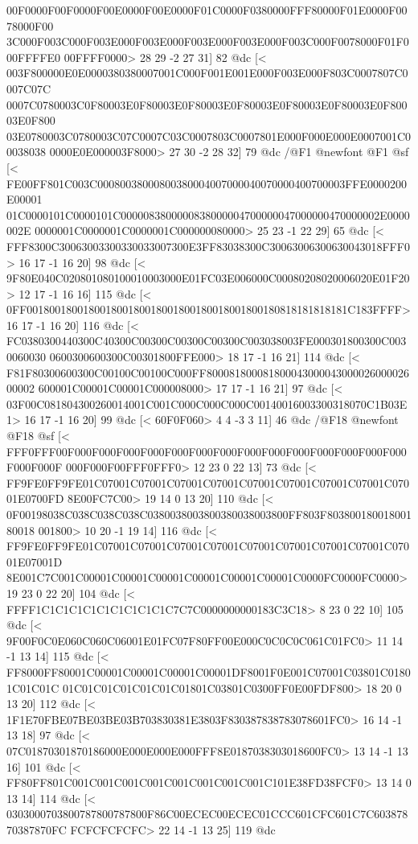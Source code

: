 00F0000F00F0000F00E0000F00E0000F01C0000F0380000FFF80000F01E0000F0078000F00
3C000F003C000F003E000F003E000F003E000F003E000F003C000F0078000F01F000FFFFE0
00FFFF0000>
	 28 29 -2 27 31] 82 @dc
[<
003F800000E0E0000380380007001C000F001E001E000F003E000F803C0007807C0007C07C
0007C0780003C0F80003E0F80003E0F80003E0F80003E0F80003E0F80003E0F80003E0F800
03E0780003C0780003C07C0007C03C0007803C0007801E000F000E000E0007001C00038038
0000E0E000003F8000>
	 27 30 -2 28 32] 79 @dc
/@F1 @newfont
@F1 @sf
[<
FE00FF801C003C00080038000800380004007000040070000400700003FFE0000200E00001
01C0000101C0000101C0000083800000838000004700000047000000470000002E0000002E
0000001C0000001C0000001C000000080000>
	 25 23 -1 22 29] 65 @dc
[<
FFF8300C30063003300330033007300E3FF83038300C30063006300630043018FFF0>
	 16 17 -1 16 20] 98 @dc
[<
9F80E040C020801080100010003000E01FC03E006000C00080208020006020E01F20>
	 12 17 -1 16 16] 115 @dc
[<
0FF001800180018001800180018001800180018001800180818181818181C183FFFF>
	 16 17 -1 16 20] 116 @dc
[<
FC0380300440300C40300C00300C00300C00300C003038003FE000301800300C0030060030
0600300600300C00301800FFE000>
	 18 17 -1 16 21] 114 @dc
[<
F81F80300600300C00100C00100C000FF80008180008180004300004300002600002600002
600001C00001C00001C000008000>
	 17 17 -1 16 21] 97 @dc
[<
03F00C081804300260014001C001C000C000C000C00140016003300318070C1B03E1>
	 16 17 -1 16 20] 99 @dc
[<
60F0F060>
	 4 4 -3 3 11] 46 @dc
/@F18 @newfont
@F18 @sf
[<
FFF0FFF00F000F000F000F000F000F000F000F000F000F000F000F000F000F000F000F000F
000F000F00FFF0FFF0>
	 12 23 0 22 13] 73 @dc
[<
FF9FE0FF9FE01C07001C07001C07001C07001C07001C07001C07001C07001C07001E0700FD
8E00FC7C00>
	 19 14 0 13 20] 110 @dc
[<
0F00198038C038C038C038C0380038003800380038003800FF803F80380018001800180018
001800>
	 10 20 -1 19 14] 116 @dc
[<
FF9FE0FF9FE01C07001C07001C07001C07001C07001C07001C07001C07001C07001E07001D
8E001C7C001C00001C00001C00001C00001C00001C00001C0000FC0000FC0000>
	 19 23 0 22 20] 104 @dc
[<
FFFF1C1C1C1C1C1C1C1C1C1C7C7C0000000000183C3C18>
	 8 23 0 22 10] 105 @dc
[<
9F00F0C0E060C060C06001E01FC07F80FF00E000C0C0C0C061C01FC0>
	 11 14 -1 13 14] 115 @dc
[<
FF8000FF80001C00001C00001C00001C00001DF8001F0E001C07001C03801C01801C01C01C
01C01C01C01C01C01C01801C03801C0300FF0E00FDF800>
	 18 20 0 13 20] 112 @dc
[<
1F1E70FBE07BE03BE03B703830381E3803F830387838783078601FC0>
	 16 14 -1 13 18] 97 @dc
[<
07C01870301870186000E000E000E000FFF8E0187038303018600FC0>
	 13 14 -1 13 16] 101 @dc
[<
FF80FF801C001C001C001C001C001C001C001C001C101E38FD38FCF0>
	 13 14 0 13 14] 114 @dc
[<
0303000703800787800787800F86C00ECEC00ECEC01CCC601CFC601C7C60387870387870FC
FCFCFCFCFC>
	 22 14 -1 13 25] 119 @dc
